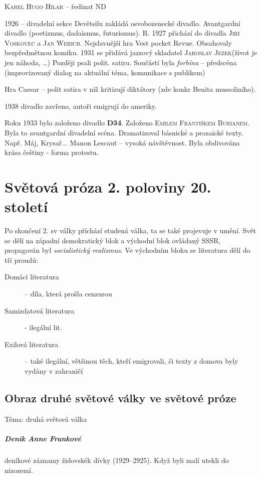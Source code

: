 \documentclass[10pt,a4page,headings,openany,%
oneside
,twocolumn
]{report}
\begin{document}
\textsc{Karel Hugo Hilar} -- ředinat ND

1926 -- divadelní sekce Devětsilu zakládá osvobozenecké divadlo. Avantgardní divadlo (poetizmus, dadaismus, futurismus). R. 1927 přichází do divadla \textsc{Jiří Voskovec} a \textsc{Jan Werich}. Nejslavnější hra Vest pocket Revue. Obsahovaly bezpředmětnou komiku. 1931 se přidává jazzový skladatel \textsc{Jaroslav Ježek}(život je jen náhoda, \dots) Později psali polit. satiru. Součástí byla \emph{forbína} -- předscéna (improvizovaný dialog na aktuální téma, komunikace s publikem)

Hra Caesar -- polit satira v níž kritizují diktátory (zde konkr Benita mussoliniho).

1938 divadlo zavřeno, autoři emigrují do ameriky.

Roku  1933 bylo založeno divadlo \textbf{D34}. Založeno \textsc{Emilem Františkem Burianem}. Byla to avantgardní divadelní scéna. Dramatizoval básnické a prozaické texty. Např. Máj, Krysař... Manon Lescaut -- vysoká návštěvnost. Byla obdivována krása češtiny - forma protestu.

\chapter{Světová próza 2. poloviny 20. století}

Po skončení 2. sv války příchází studená válka, ta se také projevuje v umění. Svět se dělí na západní demokratický blok a východní blok ovládaný SSSR, propagován byl \emph{socialistický realizmus}. Ve východním bloku se literatura dělí do tří proudů:

\begin{description}
\item[Domácí literatura] -- díla, která prošla cenzurou
\item[Samizdatová literatura] - ilegální lit.
\item[Exilová literatura] -- také ilegální, většinou těch, kteří emigrovali, či texty z domova byly vydány v zahraničí

\end{description}

\section[Druhá světová válka v próze]{Obraz druhé světové války ve světové próze}

Téma: \textsf{druhá světová válka}

\paragraph{Deník Anne Frankové} deníkové záznamy židovskék dívky (1929--2925). Když byli malí utekli do nizozemí.
\end{document}
